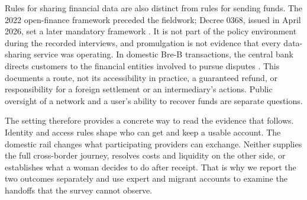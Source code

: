 Rules for sharing financial data are also distinct from rules for sending funds. The 2022 open-finance framework preceded the fieldwork; Decree 0368, issued in April 2026, set a later mandatory framework \citep{decree1297,decree0368}. It is not part of the policy environment during the recorded interviews, and promulgation is not evidence that every data-sharing service was operating. In domestic Bre-B transactions, the central bank directs customers to the financial entities involved to pursue disputes \citep{banrepfaq}. This documents a route, not its accessibility in practice, a guaranteed refund, or responsibility for a foreign settlement or an intermediary's actions. Public oversight of a network and a user's ability to recover funds are separate questions.

The setting therefore provides a concrete way to read the evidence that follows. Identity and access rules shape who can get and keep a usable account. The domestic rail changes what participating providers can exchange. Neither supplies the full cross-border journey, resolves costs and liquidity on the other side, or establishes what a woman decides to do after receipt. That is why we report the two outcomes separately and use expert and migrant accounts to examine the handoffs that the survey cannot observe.
